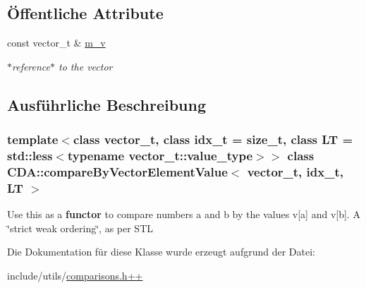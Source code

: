 \subsection*{Öffentliche Attribute}
\begin{DoxyCompactItemize}
\item 
\hypertarget{structCDA_1_1compareByVectorElementValue_a845fefe0fa9c3ac7df6f968a92711920}{
const vector\_\-t \& \hyperlink{structCDA_1_1compareByVectorElementValue_a845fefe0fa9c3ac7df6f968a92711920}{m\_\-v}}
\label{structCDA_1_1compareByVectorElementValue_a845fefe0fa9c3ac7df6f968a92711920}

\begin{DoxyCompactList}\small\item\em $\ast$reference$\ast$ to the vector \item\end{DoxyCompactList}\end{DoxyCompactItemize}


\subsection{Ausführliche Beschreibung}
\subsubsection*{template$<$class vector\_\-t, class idx\_\-t = size\_\-t, class LT = std::less$<$typename vector\_\-t::value\_\-type$>$$>$ class CDA::compareByVectorElementValue$<$ vector\_\-t, idx\_\-t, LT $>$}

Use this as a {\bfseries functor} to compare numbers a and b by the values v\mbox{[}a\mbox{]} and v\mbox{[}b\mbox{]}. A \char`\"{}strict weak ordering\char`\"{}, as per STL 

Die Dokumentation für diese Klasse wurde erzeugt aufgrund der Datei:\begin{DoxyCompactItemize}
\item 
include/utils/\hyperlink{comparisons_8h_09_09}{comparisons.h++}\end{DoxyCompactItemize}
